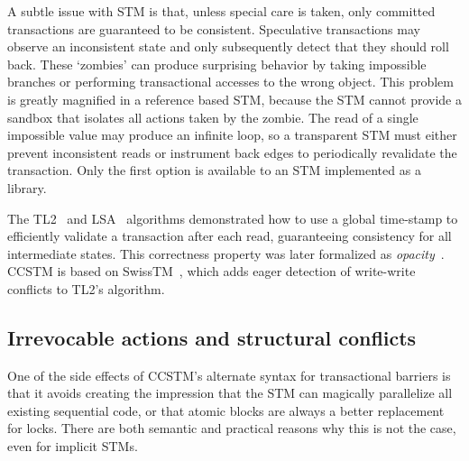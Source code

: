 A subtle issue with STM is that, unless special care is taken, only
committed transactions are guaranteed to be consistent.  Speculative
transactions may observe an inconsistent state and only subsequently
detect that they should roll back.  These `zombies' can produce
surprising behavior by taking impossible branches or performing
transactional accesses to the wrong object.  This problem is greatly
magnified in a reference based STM, because the STM cannot provide a
sandbox that isolates all actions taken by the zombie.  The read of a
single impossible value may produce an infinite loop, so a transparent
STM must either prevent inconsistent reads or instrument back edges
to periodically revalidate the transaction.  Only the first option is
available to an STM implemented as a library.

The TL2~\cite{dice06tl2} and LSA~\cite{riegel06lsa} algorithms
demonstrated how to use a global time-stamp to efficiently validate
a transaction after each read, guaranteeing consistency for all
intermediate states.  This correctness property was later formalized
as \textit{opacity}~\cite{guerraoui08opacity}.  CCSTM is based on
SwissTM~\cite{dragojevic09swisstm}, which adds eager detection of
write-write conflicts to TL2's algorithm.

\subsection{Irrevocable actions and structural conflicts}

One of the side effects of CCSTM's alternate syntax for transactional barriers
is that it avoids creating the impression that the STM can magically
parallelize all existing sequential code, or that atomic blocks are
always a better replacement for locks.  There are both semantic and
practical reasons why this is not the case, even for implicit STMs.

